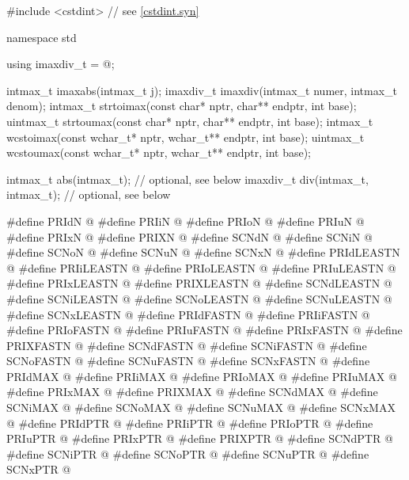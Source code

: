 %
%
%
%
%
%
%
\begin{codeblock}
#include <cstdint>  // see \ref{cstdint.syn}

namespace std {
  using imaxdiv_t = @\seebelow@;

  intmax_t imaxabs(intmax_t j);
  imaxdiv_t imaxdiv(intmax_t numer, intmax_t denom);
  intmax_t strtoimax(const char* nptr, char** endptr, int base);
  uintmax_t strtoumax(const char* nptr, char** endptr, int base);
  intmax_t wcstoimax(const wchar_t* nptr, wchar_t** endptr, int base);
  uintmax_t wcstoumax(const wchar_t* nptr, wchar_t** endptr, int base);

  intmax_t abs(intmax_t);  // optional, see below
  imaxdiv_t div(intmax_t, intmax_t);  // optional, see below
}

#define PRIdN @\seebelow@
#define PRIiN @\seebelow@
#define PRIoN @\seebelow@
#define PRIuN @\seebelow@
#define PRIxN @\seebelow@
#define PRIXN @\seebelow@
#define SCNdN @\seebelow@
#define SCNiN @\seebelow@
#define SCNoN @\seebelow@
#define SCNuN @\seebelow@
#define SCNxN @\seebelow@
#define PRIdLEASTN @\seebelow@
#define PRIiLEASTN @\seebelow@
#define PRIoLEASTN @\seebelow@
#define PRIuLEASTN @\seebelow@
#define PRIxLEASTN @\seebelow@
#define PRIXLEASTN @\seebelow@
#define SCNdLEASTN @\seebelow@
#define SCNiLEASTN @\seebelow@
#define SCNoLEASTN @\seebelow@
#define SCNuLEASTN @\seebelow@
#define SCNxLEASTN @\seebelow@
#define PRIdFASTN @\seebelow@
#define PRIiFASTN @\seebelow@
#define PRIoFASTN @\seebelow@
#define PRIuFASTN @\seebelow@
#define PRIxFASTN @\seebelow@
#define PRIXFASTN @\seebelow@
#define SCNdFASTN @\seebelow@
#define SCNiFASTN @\seebelow@
#define SCNoFASTN @\seebelow@
#define SCNuFASTN @\seebelow@
#define SCNxFASTN @\seebelow@
#define PRIdMAX @\seebelow@
#define PRIiMAX @\seebelow@
#define PRIoMAX @\seebelow@
#define PRIuMAX @\seebelow@
#define PRIxMAX @\seebelow@
#define PRIXMAX @\seebelow@
#define SCNdMAX @\seebelow@
#define SCNiMAX @\seebelow@
#define SCNoMAX @\seebelow@
#define SCNuMAX @\seebelow@
#define SCNxMAX @\seebelow@
#define PRIdPTR @\seebelow@
#define PRIiPTR @\seebelow@
#define PRIoPTR @\seebelow@
#define PRIuPTR @\seebelow@
#define PRIxPTR @\seebelow@
#define PRIXPTR @\seebelow@
#define SCNdPTR @\seebelow@
#define SCNiPTR @\seebelow@
#define SCNoPTR @\seebelow@
#define SCNuPTR @\seebelow@
#define SCNxPTR @\seebelow@
\end{codeblock}


